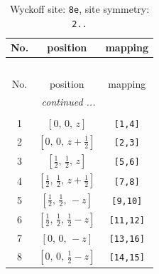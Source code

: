 \documentclass[fleqn,8pt]{jsarticle}
\begin{document}
\renewcommand{\arraystretch}{1.2}
\begin{longtable}{ccc}
\caption{Wyckoff site: {\tt 8e}, site symmetry: {\tt 2..}}
 \\
 \hline \hline
No. & position & mapping \\ \hline \endfirsthead

\multicolumn{2}{l}{\tablename\ \thetable{}} \\
 \hline \hline
No. & position & mapping \\ \hline \endhead

 \hline \hline
\multicolumn{2}{r}{\footnotesize\it continued ...} \\ \endfoot

 \hline \hline
\multicolumn{2}{r}{} \\ \endlastfoot

1 & $\left[ 0,\, 0,\, z \right]$ & {\tt [1,4]} \\ \hline
2 & $\left[ 0,\, 0,\, z + \frac{1}{2} \right]$ & {\tt [2,3]} \\ \hline
3 & $\left[ \frac{1}{2},\, \frac{1}{2},\, z \right]$ & {\tt [5,6]} \\ \hline
4 & $\left[ \frac{1}{2},\, \frac{1}{2},\, z + \frac{1}{2} \right]$ & {\tt [7,8]} \\ \hline
5 & $\left[ \frac{1}{2},\, \frac{1}{2},\, - z \right]$ & {\tt [9,10]} \\ \hline
6 & $\left[ \frac{1}{2},\, \frac{1}{2},\, \frac{1}{2} - z \right]$ & {\tt [11,12]} \\ \hline
7 & $\left[ 0,\, 0,\, - z \right]$ & {\tt [13,16]} \\ \hline
8 & $\left[ 0,\, 0,\, \frac{1}{2} - z \right]$ & {\tt [14,15]} \\
\end{longtable}
\renewcommand{\arraystretch}{1.2}
\end{document}
